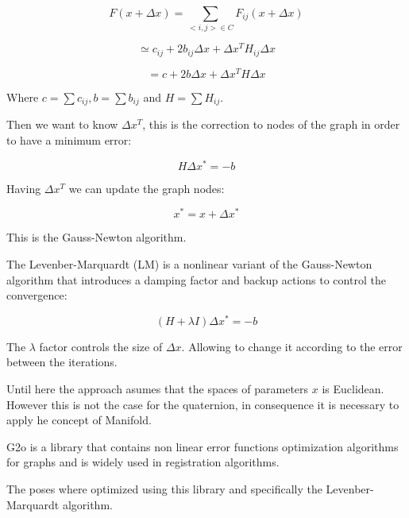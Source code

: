 \begin{equation}
F(x + \Delta x) =  \sum\limits_{<i,j> \in C } F_{ij}(x + \Delta x) 
\end{equation}



\begin{equation}
\simeq  c_{ij} + 2 b_{ij} \Delta x + \Delta x^T H_{ij} \Delta x
\end{equation}

\begin{equation}
=   c + 2 b \Delta x + \Delta x^T H \Delta x
\end{equation}

Where $c=\sum{c_{ij}}, b=\sum{b_{ij}}$ and $H=\sum{H_{ij}}$.

Then we want to know $\Delta x^T$, this is the correction to nodes of the graph in order 
to have a minimum error:

\begin{equation}
H \Delta x^* = -b
\end{equation}

Having $\Delta x^T$ we can update the graph nodes:

\begin{equation}
x^* = x + \Delta x^* 
\end{equation}

This is the Gauss-Newton algorithm. 

The Levenber-Marquardt (LM) is a nonlinear variant of the Gauss-Newton algorithm that introduces a
damping factor and backup actions to control the convergence:

\begin{equation}
(H + \lambda I) \Delta x^* = -b
\end{equation}

The $\lambda$ factor controls the size of $ \Delta x$. Allowing to change it according to the error between the iterations.
 
Until here the approach asumes that the spaces of parameters $x$ is Euclidean. However this is not the case for the quaternion, 
in consequence it is necessary to apply he concept of Manifold.



G2o is a library that contains non linear error functions optimization 
algorithms for graphs and is widely used in registration algorithms. 

The poses where optimized using this library and specifically the 
Levenber-Marquardt algorithm.

